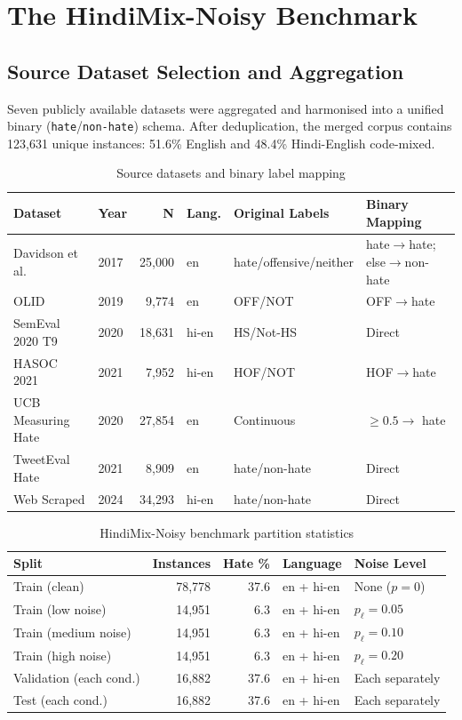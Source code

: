 \documentclass[12pt,a4paper]{report}
\begin{document}
\chapter{The HindiMix-Noisy Benchmark}

\section{Source Dataset Selection and Aggregation}
Seven publicly available datasets were aggregated and harmonised into a unified binary (\texttt{hate}/\texttt{non-hate}) schema. After deduplication, the merged corpus contains 123,631 unique instances: 51.6\% English and 48.4\% Hindi-English code-mixed.

\begin{table}[H]
\centering
\caption{Source datasets and binary label mapping}
\label{tab:sources}
\small
\begin{tabular}{llrllp{3.5cm}}
\toprule
\textbf{Dataset} & \textbf{Year} & \textbf{N} & \textbf{Lang.} & \textbf{Original Labels} & \textbf{Binary Mapping}\\
\midrule
Davidson et al. & 2017 & 25,000 & en & hate/offensive/neither & hate$\rightarrow$hate; else$\rightarrow$non-hate \\
OLID & 2019 & 9,774 & en & OFF/NOT & OFF$\rightarrow$hate \\
SemEval 2020 T9 & 2020 & 18,631 & hi-en & HS/Not-HS & Direct \\
HASOC 2021 & 2021 & 7,952 & hi-en & HOF/NOT & HOF$\rightarrow$hate \\
UCB Measuring Hate & 2020 & 27,854 & en & Continuous & $\geq 0.5 \rightarrow$ hate \\
TweetEval Hate & 2021 & 8,909 & en & hate/non-hate & Direct \\
Web Scraped & 2024 & 34,293 & hi-en & hate/non-hate & Direct \\
\bottomrule
\end{tabular}
\end{table}

\begin{table}[H]
\centering
\caption{HindiMix-Noisy benchmark partition statistics}
\label{tab:benchmark}
\small
\begin{tabular}{lrrll}
\toprule
\textbf{Split} & \textbf{Instances} & \textbf{Hate \%} & \textbf{Language} & \textbf{Noise Level}\\
\midrule
Train (clean)        & 78,778 & 37.6 & en + hi-en & None ($p=0$) \\
Train (low noise)    & 14,951 &  6.3 & en + hi-en & $p_{\ell}=0.05$ \\
Train (medium noise) & 14,951 &  6.3 & en + hi-en & $p_{\ell}=0.10$ \\
Train (high noise)   & 14,951 &  6.3 & en + hi-en & $p_{\ell}=0.20$ \\
Validation (each cond.) & 16,882 & 37.6 & en + hi-en & Each separately \\
Test (each cond.)    & 16,882 & 37.6 & en + hi-en & Each separately \\
\bottomrule
\end{tabular}
\end{table}
\end{document}
